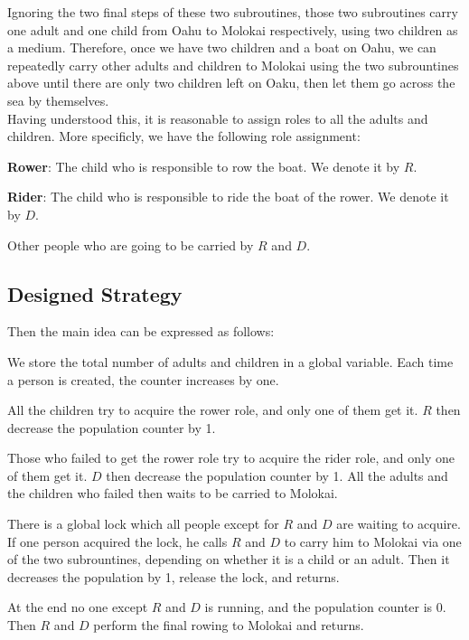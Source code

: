 \documentclass{article}
\begin{document}
\begin{spacing}{1.1}
Ignoring the two final steps of these two subroutines, those two subroutines carry one adult and one child from Oahu to Molokai respectively, using two children as a medium. Therefore, once we have two children and a boat on Oahu, we can repeatedly carry other adults and children to Molokai using the two subrountines above until there are only two children left on Oaku, then let them go across the sea by themselves.\\

Having understood this, it is reasonable to assign roles to all the adults and children. More specificly, we have the following role assignment:
\begin{asparaitem}
  \item \textbf{Rower}: The child who is responsible to row the boat. We denote it by $R$.\\
  \item \textbf{Rider}: The child who is responsible to ride the boat of the rower. We denote it by $D$.\\
  \item Other people who are going to be carried by $R$ and $D$.\\
\end{asparaitem}

\subsection{Designed Strategy}
Then the main idea can be expressed as follows:
\begin{asparaitem}
  \item We store the total number of adults and children in a global variable. Each time a person is created, the counter increases by one.\\
  \item All the children try to acquire the rower role, and only one of them get it. $R$ then decrease the population counter by 1.\\
  \item Those who failed to get the rower role try to acquire the rider role, and only one of them get it. $D$ then decrease the population counter by 1. All the adults and the children who failed then waits to be carried to Molokai.\\
  \item There is a global lock which all people except for $R$ and $D$ are waiting to acquire. If one person acquired the lock, he calls $R$ and $D$ to carry him to Molokai via one of the two subrountines, depending on whether it is a child or an adult. Then it decreases the population by 1, release the lock, and returns.\\
  \item At the end no one except $R$ and $D$ is running, and the population counter is 0. Then $R$ and $D$ perform the final rowing to Molokai and returns.
\end{asparaitem}


\end{spacing}
\end{document}
